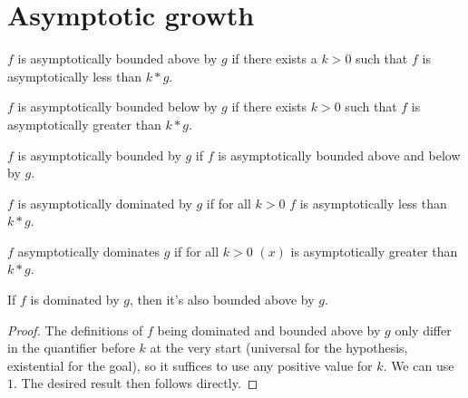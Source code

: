 \section{Asymptotic growth}

\begin{definition}
    \label{def:asymp_bounded_above}
    \leanok
    $f$ is asymptotically bounded above by $g$ if there exists a $k > 0$ 
    such that $f$ is asymptotically less than $k*g$.
\end{definition}

\begin{definition}
    \label{def:asymp_bounded_below}
    \leanok
    $f$ is asymptotically bounded below by $g$ if there exists $k > 0$ 
    such that $f$ is asymptotically greater than $k*g$.
\end{definition}

\begin{definition}
    \label{def:asymp_bounded}
    \leanok
    $f$ is asymptotically bounded by $g$ if $f$ is asymptotically bounded
    above and below by $g$.
\end{definition}

\begin{definition}
    \label{def:asymp_right_dom}
    \leanok
    $f$ is asymptotically dominated by $g$ if for all $k > 0$ $f$ is asymptotically 
    less than $k*g$.

\end{definition}

\begin{definition}
    \label{def:asymp_left_dom}
    \leanok
    $f$ asymptotically dominates $g$ if for all $k > 0$ $(x)$ is asymptotically
    greater than $k*g$.

\end{definition}

\begin{lemma}
    \label{lemma:asymp_bounded_above_of_right_dom}
    \leanok
    If $f$ is dominated by $g$, then it's also bounded above by $g$.
\end{lemma}

\begin{proof}
    \leanok 
    The definitions of $f$ being dominated and bounded above by $g$ only differ
    in the quantifier before $k$ at the very start (universal for the hypothesis, existential
    for the goal), so it suffices to use any positive value for $k$. We can use $1$. 
    The desired result then follows directly.
\end{proof}

